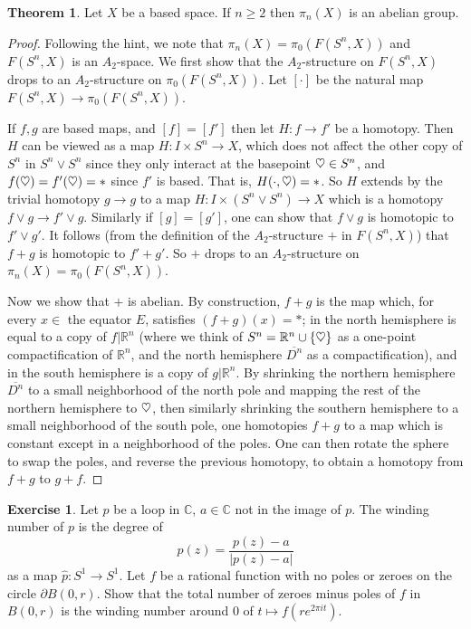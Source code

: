 \documentclass[10pt]{article}
\newcommand{\RR}{\mathbb{R}}
\newcommand{\CC}{\mathbb{C}}
\newcommand{\heart}{\ensuremath\heartsuit}
\theoremstyle{definition}
\newtheorem{exer}{Exercise}
\newtheorem{theorem}[lemma]{Theorem}
\begin{document}
\begin{theorem}
Let $X$ be a based space. If $n \geq 2$ then $\pi_n(X)$ is an abelian group.
\end{theorem}
\begin{proof}
Following the hint, we note that $\pi_n(X) = \pi_0(F(S^n, X))$ and $F(S^n, X)$ is an $A_2$-space.
We first show that the $A_2$-structure on $F(S^n, X)$ drops to an $A_2$-structure on $\pi_0(F(S^n, X))$.
Let $[\cdot]$ be the natural map $F(S^n, X) \to \pi_0(F(S^n, X))$.

If $f,g$ are based maps, and $[f] = [f']$ then let $H: f \to f'$ be a homotopy.
Then $H$ can be viewed as a map $H: I \times S^n \to X$, which does not affect the other copy of $S^n$ in $S^n \vee S^n$ since they only interact at the basepoint $\heart \in S^n$, and $f(\heart) = f'(\heart) = *$ since $f'$ is based.
That is, $H(\cdot, \heart) = *$.
So $H$ extends by the trivial homotopy $g \to g$ to a map $H: I \times (S^n \vee S^n) \to X$ which is a homotopy $f \vee g \to f' \vee g$.
Similarly if $[g] = [g']$, one can show that $f \vee g$ is homotopic to $f' \vee g'$.
It follows (from the definition of the $A_2$-structure $+$ in $F(S^n, X)$) that $f + g$ is homotopic to $f' + g'$.
So $+$ drops to an $A_2$-structure on $\pi_n(X) = \pi_0(F(S^n, X))$.

Now we show that $+$ is abelian. By construction, $f + g$ is the map which, for every $x \in$ the equator $E$, satisfies $(f+g)(x) = *$; in the north hemisphere is equal to a copy of $f|\RR^n$ (where we think of $S^n = \RR^n \cup \{\heart\}$ as a one-point compactification of $\RR^n$, and the north hemisphere $\overline{D^n}$ as a compactification), and in the south hemisphere is a copy of $g|\RR^n$.
By shrinking the northern hemisphere $\overline{D^n}$ to a small neighborhood of the north pole and mapping the rest of the northern hemisphere to $\heart$, then similarly shrinking the southern hemisphere to a small neighborhood of the south pole, one homotopies $f + g$ to a map which is constant except in a neighborhood of the poles.
One can then rotate the sphere to swap the poles, and reverse the previous homotopy, to obtain a homotopy from $f + g$ to $g + f$.
\end{proof}

\begin{exer}
Let $p$ be a loop in $\CC$, $a \in \CC$ not in the image of $p$. The winding number of $p$ is the degree of
$$\hat p(z) = \frac{p(z) - a}{|p(z) - a|}$$
as a map $\hat p: S^1 \to S^1$. Let $f$ be a rational function with no poles or zeroes on the circle $\partial B(0, r)$.
Show that the total number of zeroes minus poles of $f$ in $B(0, r)$ is the winding number around $0$ of $t \mapsto f(re^{2\pi it})$.
\end{exer}
\end{document}
